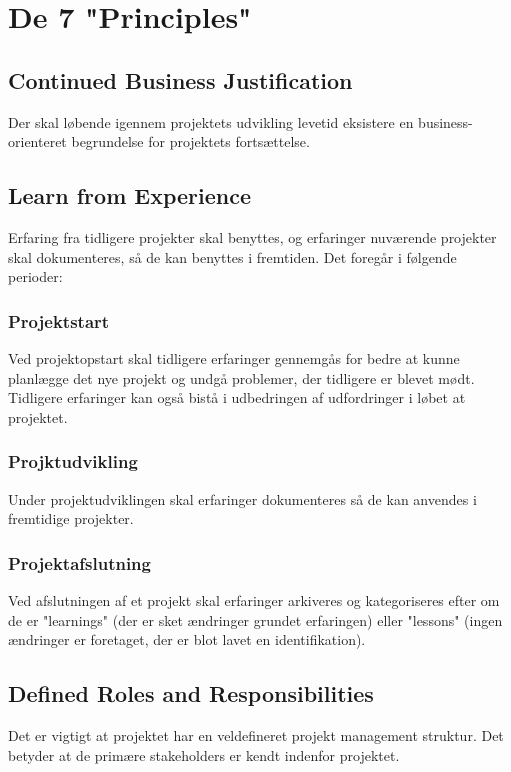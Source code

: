 \chapter{De 7 "Principles"}

\section{Continued Business Justification}
Der skal løbende igennem projektets udvikling levetid eksistere en business-orienteret begrundelse for projektets fortsættelse.

\section{Learn from Experience}
Erfaring fra tidligere projekter skal benyttes, og erfaringer nuværende projekter skal dokumenteres, så de kan benyttes i fremtiden. Det foregår i følgende perioder:

\subsection{Projektstart}
Ved projektopstart skal tidligere erfaringer gennemgås for bedre at kunne planlægge det nye projekt og undgå problemer, der tidligere er blevet mødt. Tidligere erfaringer kan også bistå i udbedringen af udfordringer i løbet at projektet.
\subsection{Projktudvikling}
Under projektudviklingen skal erfaringer dokumenteres så de kan anvendes i fremtidige projekter.
\subsection{Projektafslutning}
Ved afslutningen af et projekt skal erfaringer arkiveres og kategoriseres efter om de er "learnings" (der er sket ændringer grundet erfaringen) eller "lessons" (ingen ændringer er foretaget, der er blot lavet en identifikation).

\section{Defined Roles and Responsibilities}
\label{sec:defined_roles_and_responsibilities}
Det er vigtigt at projektet har en veldefineret projekt management struktur. Det betyder at de primære stakeholders er kendt indenfor projektet.

